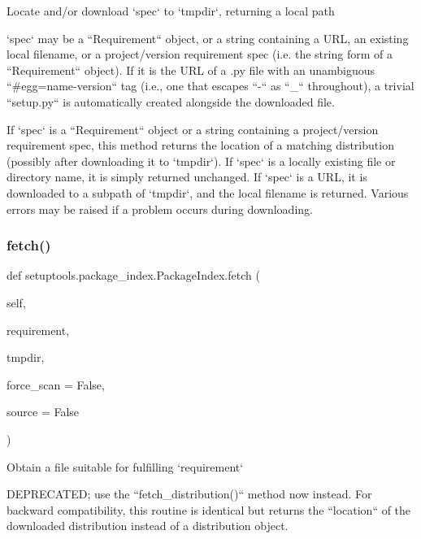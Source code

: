\begin{DoxyVerb}Locate and/or download `spec` to `tmpdir`, returning a local path

`spec` may be a ``Requirement`` object, or a string containing a URL,
an existing local filename, or a project/version requirement spec
(i.e. the string form of a ``Requirement`` object).  If it is the URL
of a .py file with an unambiguous ``#egg=name-version`` tag (i.e., one
that escapes ``-`` as ``_`` throughout), a trivial ``setup.py`` is
automatically created alongside the downloaded file.

If `spec` is a ``Requirement`` object or a string containing a
project/version requirement spec, this method returns the location of
a matching distribution (possibly after downloading it to `tmpdir`).
If `spec` is a locally existing file or directory name, it is simply
returned unchanged.  If `spec` is a URL, it is downloaded to a subpath
of `tmpdir`, and the local filename is returned.  Various errors may be
raised if a problem occurs during downloading.
\end{DoxyVerb}
 \mbox{\label{classsetuptools_1_1package__index_1_1PackageIndex_a4fa8a0112703f75c6af17996ce6eb66e}} 
\subsubsection{\texorpdfstring{fetch()}{fetch()}}
{\footnotesize\ttfamily def setuptools.\+package\+\_\+index.\+Package\+Index.\+fetch (\begin{DoxyParamCaption}\item[{}]{self,  }\item[{}]{requirement,  }\item[{}]{tmpdir,  }\item[{}]{force\+\_\+scan = {\ttfamily False},  }\item[{}]{source = {\ttfamily False} }\end{DoxyParamCaption})}

\begin{DoxyVerb}Obtain a file suitable for fulfilling `requirement`

DEPRECATED; use the ``fetch_distribution()`` method now instead.  For
backward compatibility, this routine is identical but returns the
``location`` of the downloaded distribution instead of a distribution
object.
\end{DoxyVerb}
 \mbox{\label{classsetuptools_1_1package__index_1_1PackageIndex_a991bcc357db71bc05773ce3bb03c85a4}} 
